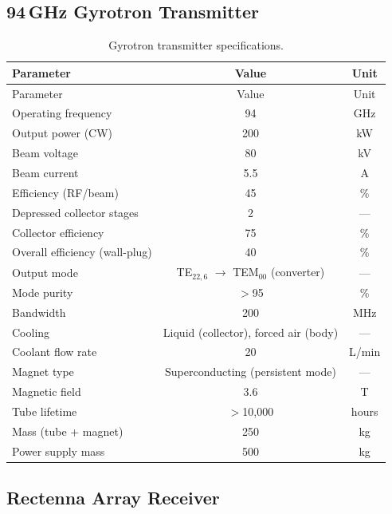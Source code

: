 \documentclass[11pt,a4paper]{article}
\begin{document}
\subsection{94\,GHz Gyrotron Transmitter}

\begin{longtable}{lcc}
\caption{Gyrotron transmitter specifications.} \\
\toprule
Parameter & Value & Unit \\
\midrule
\endfirsthead
\toprule
Parameter & Value & Unit \\
\midrule
\endhead
\bottomrule
\endlastfoot
Operating frequency & 94 & GHz \\
Output power (CW) & 200 & kW \\
Beam voltage & 80 & kV \\
Beam current & 5.5 & A \\
Efficiency (RF/beam) & 45 & \% \\
Depressed collector stages & 2 & --- \\
Collector efficiency & 75 & \% \\
Overall efficiency (wall-plug) & 40 & \% \\
Output mode & TE$_{22,6}$ $\to$ TEM$_{00}$ (converter) & --- \\
Mode purity & $>$95 & \% \\
Bandwidth & 200 & MHz \\
Cooling & Liquid (collector), forced air (body) & --- \\
Coolant flow rate & 20 & L/min \\
Magnet type & Superconducting (persistent mode) & --- \\
Magnetic field & 3.6 & T \\
Tube lifetime & $>$10{,}000 & hours \\
Mass (tube + magnet) & 250 & kg \\
Power supply mass & 500 & kg \\
\end{longtable}

\subsection{Rectenna Array Receiver}
\end{document}

